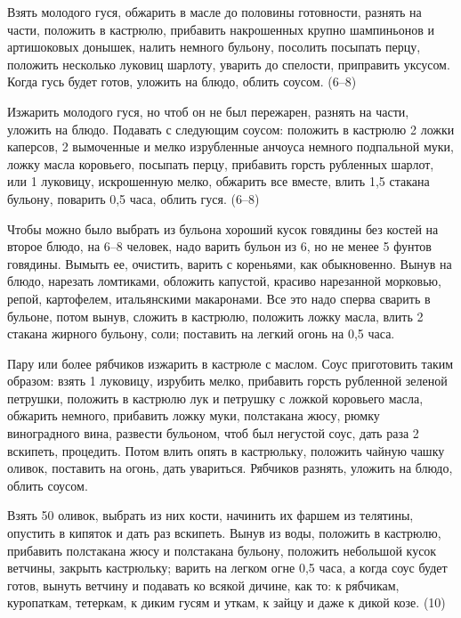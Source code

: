 
Взять молодого гуся, обжарить в масле до половины готовности, разнять на части, положить в кастрюлю, прибавить накрошенных крупно шампиньонов и артишоковых донышек, налить немного бульону, посолить посыпать перцу, положить несколько луковиц шарлоту, уварить до спелости, приправить уксусом. Когда гусь будет готов, уложить на блюдо, облить соусом. (6--8) 


Изжарить молодого гуся, но чтоб он не был пережарен, разнять на части, уложить на блюдо. Подавать с следующим соусом: положить в кастрюлю 2 ложки каперсов, 2 вымоченные и мелко изрубленные анчоуса немного подпальной муки, ложку масла коровьего, посыпать перцу, прибавить горсть рубленных шарлот, или 1 луковицу, искрошенную мелко, обжарить все вместе, влить 1,5 стакана бульону, поварить 0,5 часа, облить гуся. (6--8) 


Чтобы можно было выбрать из бульона хороший кусок говядины без костей на второе блюдо, на 6--8 человек, надо варить бульон из 6, но не менее 5 фунтов говядины. Вымыть ее, очистить, варить с кореньями, как обыкновенно. Вынув на блюдо, нарезать ломтиками, обложить капустой, красиво нарезанной морковью, репой, картофелем, итальянскими макаронами. Все это надо сперва сварить в бульоне, потом вынув, сложить в кастрюлю, положить ложку масла, влить 2 стакана жирного бульону, соли; поставить на легкий огонь на 0,5 часа. 


Пару или более рябчиков изжарить в кастрюле с маслом. Соус приготовить таким образом: взять 1 луковицу, изрубить мелко, прибавить горсть рубленной зеленой петрушки, положить в кастрюлю лук и петрушку с ложкой коровьего масла, обжарить немного, прибавить ложку муки, полстакана жюсу, рюмку виноградного вина, развести бульоном, чтоб был негустой соус, дать раза 2 вскипеть, процедить. Потом влить опять в кастрюльку, положить чайную чашку оливок, поставить на огонь, дать увариться. Рябчиков разнять, уложить на блюдо, облить соусом. 


Взять 50 оливок, выбрать из них кости, начинить их фаршем из телятины, опустить в кипяток и дать раз вскипеть. Вынув из воды, положить в кастрюлю, прибавить полстакана жюсу и полстакана бульону, положить небольшой кусок ветчины, закрыть кастрюльку; варить на легком огне 0,5 часа, а когда соус будет готов, вынуть ветчину и подавать ко всякой дичине, как то: к рябчикам, куропаткам, тетеркам, к диким гусям и уткам, к зайцу и даже к дикой козе. (10) 

